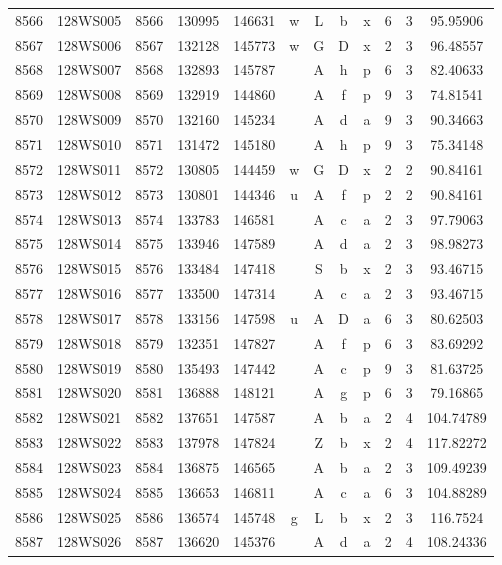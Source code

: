 \begin{tabular}{|*{12}{c|}}
8566 & 128WS005 & 8566 & 130995 & 146631 & w & L & b & x & 6 & 3 & 95.95906 \\ 
8567 & 128WS006 & 8567 & 132128 & 145773 & w & G & D & x & 2 & 3 & 96.48557 \\ 
8568 & 128WS007 & 8568 & 132893 & 145787 &  & A & h & p & 6 & 3 & 82.40633 \\ 
8569 & 128WS008 & 8569 & 132919 & 144860 &  & A & f & p & 9 & 3 & 74.81541 \\ 
8570 & 128WS009 & 8570 & 132160 & 145234 &  & A & d & a & 9 & 3 & 90.34663 \\ 
8571 & 128WS010 & 8571 & 131472 & 145180 &  & A & h & p & 9 & 3 & 75.34148 \\ 
8572 & 128WS011 & 8572 & 130805 & 144459 & w & G & D & x & 2 & 2 & 90.84161 \\ 
8573 & 128WS012 & 8573 & 130801 & 144346 & u & A & f & p & 2 & 2 & 90.84161 \\ 
8574 & 128WS013 & 8574 & 133783 & 146581 &  & A & c & a & 2 & 3 & 97.79063 \\ 
8575 & 128WS014 & 8575 & 133946 & 147589 &  & A & d & a & 2 & 3 & 98.98273 \\ 
8576 & 128WS015 & 8576 & 133484 & 147418 &  & S & b & x & 2 & 3 & 93.46715 \\ 
8577 & 128WS016 & 8577 & 133500 & 147314 &  & A & c & a & 2 & 3 & 93.46715 \\ 
8578 & 128WS017 & 8578 & 133156 & 147598 & u & A & D & a & 6 & 3 & 80.62503 \\ 
8579 & 128WS018 & 8579 & 132351 & 147827 &  & A & f & p & 6 & 3 & 83.69292 \\ 
8580 & 128WS019 & 8580 & 135493 & 147442 &  & A & c & p & 9 & 3 & 81.63725 \\ 
8581 & 128WS020 & 8581 & 136888 & 148121 &  & A & g & p & 6 & 3 & 79.16865 \\ 
8582 & 128WS021 & 8582 & 137651 & 147587 &  & A & b & a & 2 & 4 & 104.74789 \\ 
8583 & 128WS022 & 8583 & 137978 & 147824 &  & Z & b & x & 2 & 4 & 117.82272 \\ 
8584 & 128WS023 & 8584 & 136875 & 146565 &  & A & b & a & 2 & 3 & 109.49239 \\ 
8585 & 128WS024 & 8585 & 136653 & 146811 &  & A & c & a & 6 & 3 & 104.88289 \\ 
8586 & 128WS025 & 8586 & 136574 & 145748 & g & L & b & x & 2 & 3 & 116.7524 \\ 
8587 & 128WS026 & 8587 & 136620 & 145376 &  & A & d & a & 2 & 4 & 108.24336 \\ 

\end{tabular}
